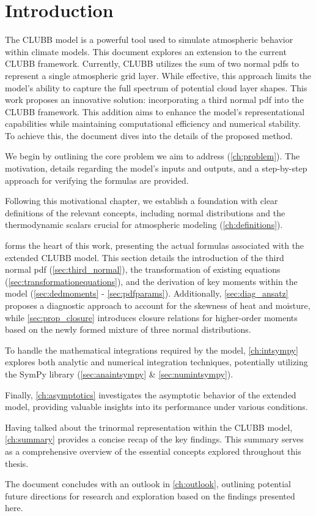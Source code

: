 \chapter{Introduction}\label{ch:introduction}

The \gls{CLUBB} model is a powerful tool used to simulate atmospheric behavior within climate models.
This document explores an extension to the current \gls{CLUBB} framework.
Currently, \gls{CLUBB} utilizes the sum of two normal \glspl{pdf}
to represent a single atmospheric grid layer.
While effective,
this approach limits the model's ability to capture the full spectrum of potential cloud layer shapes.
This work proposes an innovative solution:
incorporating a third normal \gls{pdf} into the \gls{CLUBB} framework.
This addition aims to enhance the model's representational capabilities
while maintaining computational efficiency and numerical stability.
To achieve this, the document dives into the details of the proposed method.

We begin by outlining the core problem we aim to address (\cref{ch:problem}).
The motivation, details regarding the model's inputs and outputs,
and a step-by-step approach for verifying the formulas are provided.

Following this motivational chapter,
we establish a foundation with clear definitions of the relevant concepts,
including normal distributions and the thermodynamic scalars
crucial for atmospheric modeling (\cref{ch:definitions}).

 forms the heart of this work,
presenting the actual formulas associated with the extended \gls{CLUBB} model.
This section details the introduction of the third normal \gls{pdf} (\cref{sec:third_normal}),
the transformation of existing equations (\cref{sec:transformationequations}),
and the derivation of key moments within the model (\cref{sec:dedmoments} - \cref{sec:pdfparams}).
Additionally,
\cref{sec:diag_ansatz} proposes a diagnostic approach
to account for the skewness of heat and moisture,
while \cref{sec:prop_closure} introduces closure relations
for higher-order moments based on the newly formed mixture of three normal distributions.

To handle the mathematical integrations required by the model,
\cref{ch:intsympy} explores both analytic and numerical integration techniques,
potentially utilizing the SymPy library (\cref{sec:anaintsympy} \& \cref{sec:numintsympy}).

Finally,
\cref{ch:asymptotics} investigates the asymptotic behavior of the extended model,
providing valuable insights into its performance under various conditions.

Having talked about the trinormal representation within the \gls{CLUBB} model,
\cref{ch:summary} provides a concise recap of the key findings.
This summary serves as a comprehensive overview of the essential concepts
explored throughout this thesis.

The document concludes with an outlook in \cref{ch:outlook},
outlining potential future directions for research
and exploration based on the findings presented here.
